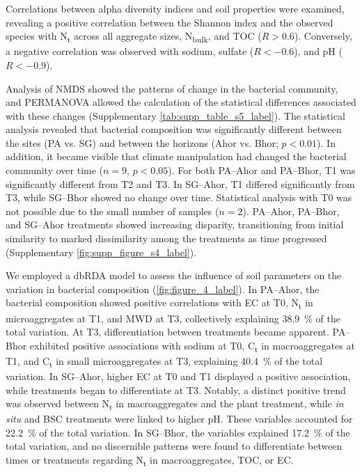 Correlations between alpha diversity indices and soil properties were examined, revealing a positive correlation between the Shannon index and the observed species with N\textsubscript{t} across all aggregate sizes, N\textsubscript{bulk}, and TOC (\(R > 0.6\)). Conversely, a negative correlation was observed with sodium, sulfate (\(R < -0.6\)), and pH (\(R < -0.9\)).

Analysis of NMDS showed the patterns of change in the bacterial community, and PERMANOVA allowed the calculation of the statistical differences associated with these changes (Supplementary \cref{tab:supp_table_s5_label}). The statistical analysis revealed that bacterial composition was significantly different between the sites (PA vs. SG) and between the horizons (Ahor vs. Bhor; \(p < 0.01\)). In addition, it became visible that climate manipulation had changed the bacterial community over time (\(n=9\), \(p < 0.05\)). For both PA--Ahor and PA--Bhor, T1 was significantly different from T2 and T3. In SG--Ahor, T1 differed significantly from T3, while SG--Bhor showed no change over time. Statistical analysis with T0 was not possible due to the small number of samples (\(n=2\)). PA--Ahor, PA--Bhor, and SG--Ahor treatments showed increasing disparity, transitioning from initial similarity to marked dissimilarity among the treatments as time progressed (Supplementary \cref{fig:supp_figure_s4_label}).

We employed a dbRDA model to assess the influence of soil parameters on the variation in bacterial composition (\cref{fig:figure_4_label}). In PA--Ahor, the bacterial composition showed positive correlations with EC at T0, N\textsubscript{t} in microaggregates at T1, and MWD at T3, collectively explaining \SI{38.9}{\percent} of the total variation. At T3, differentiation between treatments became apparent. PA--Bhor exhibited positive associations with sodium at T0, C\textsubscript{t} in macroaggregates at T1, and C\textsubscript{t} in small microaggregates at T3, explaining \SI{40.4}{\percent} of the total variation. In SG--Ahor, higher EC at T0 and T1 displayed a positive association, while treatments began to differentiate at T3. Notably, a distinct positive trend was observed between N\textsubscript{t} in macroaggregates and the plant treatment, while \textit{in situ} and BSC treatments were linked to higher pH. These variables accounted for \SI{22.2}{\percent} of the total variation. In SG--Bhor, the variables explained \SI{17.2}{\percent} of the total variation, and no discernible patterns were found to differentiate between times or treatments regarding N\textsubscript{t} in macroaggregates, TOC, or EC.

